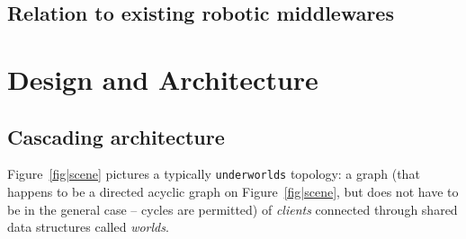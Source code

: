 \documentclass[letterpaper, 10 pt, conference]{ieeeconf}  %
\newcommand{\uwds}{{\tt underworlds}\xspace}
\begin{document}
\subsection{Relation to existing robotic middlewares}

\section{Design and Architecture}

\subsection{Cascading architecture}

Figure~\ref{fig|scene} pictures a typically \uwds topology: a graph (that
happens to be a directed acyclic graph on Figure~\ref{fig|scene}, but does not
have to be in the general case -- cycles are permitted) of \emph{clients}
connected through shared data structures called \emph{worlds}.
\end{document}
